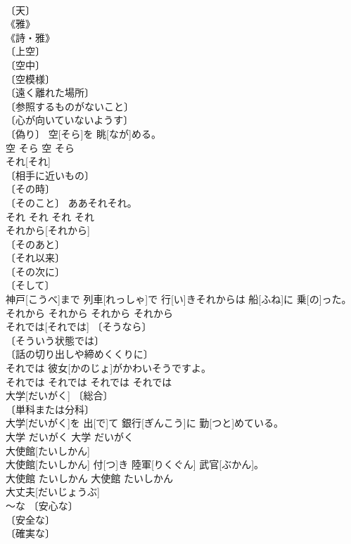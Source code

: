 \documentclass[8pt]{extreport}
\begin{document}
\begin{CJK}{UTF8}{min}
\\	〔天〕 
\\	《雅》 
\\	《詩・雅》 
\\	〔上空〕 
\\	〔空中〕 
\\	〔空模様〕 
\\	〔遠く離れた場所〕 
\\	〔参照するものがないこと〕 
\\	〔心が向いていないようす〕 
\\	〔偽り〕	空[そら]を 眺[なが]める。	
\\	空	そら	空	そら	
\\	それ[それ]	
\\	〔相手に近いもの〕 
\\	〔その時〕 
\\	〔そのこと〕	ああそれそれ。	
\\	それ	それ	それ	それ	
\\	それから[それから]	
\\	〔そのあと〕 
\\	〔それ以来〕 
\\	〔その次に〕 
\\	〔そして〕 
\\	神戸[こうべ]まで 列車[れっしゃ]で 行[い]きそれからは 船[ふね]に 乗[の]った。	
\\	それから	それから	それから	それから	
\\	それでは[それでは]	〔そうなら〕 
\\	〔そういう状態では〕 
\\	〔話の切り出しや締めくくりに〕 
\\	それでは 彼女[かのじょ]がかわいそうですよ。	
\\	それでは	それでは	それでは	それでは	
\\	大学[だいがく]	〔総合〕 
\\	〔単科または分科〕 
\\	大学[だいがく]を 出[で]て 銀行[ぎんこう]に 勤[つと]めている。	
\\	大学	だいがく	大学	だいがく	
\\	大使館[たいしかん]	
\\	大使館[たいしかん] 付[つ]き 陸軍[りくぐん] 武官[ぶかん]。	
\\	大使館	たいしかん	大使館	たいしかん	
\\	大丈夫[だいじょうぶ]	
\\	～な 〔安心な〕 
\\	〔安全な〕 
\\	〔確実な〕 

\end{CJK}
\end{document}
